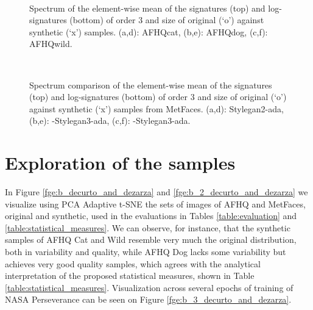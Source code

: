 \documentclass[lettersize,journal]{IEEEtran}
\begin{document}
\begin{figure}[ht]
\centering
{}
 \\
\caption{Spectrum of the element-wise mean of the signatures  (top) and log-signatures  (bottom) of order 3 and size  of original (`o') against synthetic (`x') samples. (a,d): AFHQcat, (b,e): AFHQdog, (c,f): AFHQwild.}
\label{fge:23_decurto_and_dezarza}
\end{figure}

\begin{figure}[ht]
\centering
{}
\\
\caption{Spectrum comparison of the element-wise mean of the signatures  (top) and log-signatures  (bottom) of order 3 and size  of original (`o') against synthetic (`x') samples from MetFaces. (a,d): Stylegan2-ada, (b,e): -Stylegan3-ada, (c,f): -Stylegan3-ada.}
\label{fge:27_decurto_and_dezarza}
\end{figure}

\section{Exploration of the samples}
\label{sn:exploration}

In Figure \ref{fge:b_decurto_and_dezarza} and \ref{fge:b_2_decurto_and_dezarza} we visualize using PCA Adaptive t-SNE the sets of images of AFHQ and MetFaces, original and synthetic, used in the evaluations in Tables \ref{table:evaluation} and \ref{table:statistical_measures}. We can observe, for instance, that the synthetic samples of AFHQ Cat and Wild resemble very much the original distribution, both in variability and quality, while AFHQ Dog lacks some variability but achieves very good quality samples, which agrees with the analytical interpretation of the proposed statistical measures, shown in Table \ref{table:statistical_measures}. Visualization across several epochs of training of NASA Perseverance can be seen on Figure \ref{fge:b_3_decurto_and_dezarza}.
\end{document}

